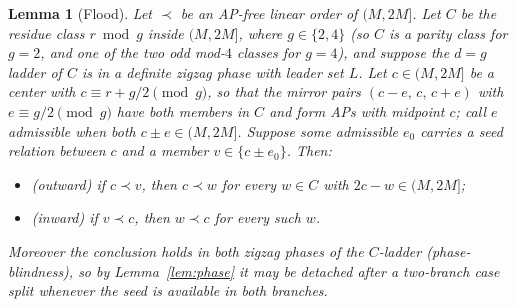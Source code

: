 \documentclass[11pt]{article}
\newtheorem{lemma}[theorem]{Lemma}
\theoremstyle{definition}
\begin{document}
\begin{lemma}[Flood]\label{lem:flood}
Let $\prec$ be an AP-free linear order of $(M, 2M]$. Let $C$ be the
residue class $r \bmod g$ inside $(M, 2M]$, where $g \in \{2, 4\}$ (so
$C$ is a parity class for $g = 2$, and one of the two odd mod-$4$
classes for $g = 4$), and suppose the
$d = g$ ladder of $C$ is in a definite zigzag phase with leader set $L$. Let
$c \in (M, 2M]$ be a \emph{center} with $c \equiv r + g/2 \pmod g$, so
that the mirror pairs $(c - e,\, c,\, c + e)$ with $e \equiv g/2
\pmod g$ have both members in $C$ and form APs with midpoint $c$; call
$e$ \emph{admissible} when both $c \pm e \in (M, 2M]$. Suppose some
admissible $e_0$ carries a seed relation between $c$ and a member
$v \in \{c \pm e_0\}$. Then:
\begin{itemize}
\item (outward) if $c \prec v$, then $c \prec w$ for \emph{every}
$w \in C$ with $2c - w \in (M, 2M]$;
\item (inward) if $v \prec c$, then $w \prec c$ for every such $w$.
\end{itemize}
Moreover the conclusion holds in both zigzag phases of the $C$-ladder
(\emph{phase-blindness}), so by Lemma~\ref{lem:phase} it may be
detached after a two-branch case split whenever the seed is available
in both branches.
\end{lemma}
\end{document}

